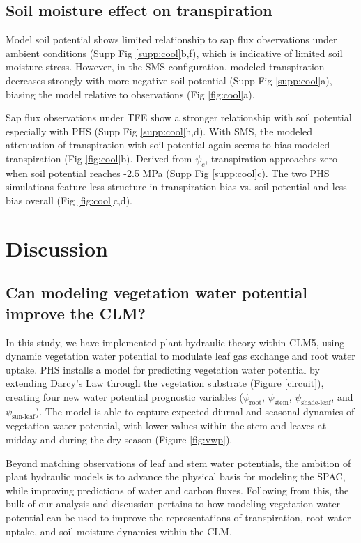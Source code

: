 \documentclass[draft,linenumbers]{agujournal}
\begin{document}
 
\subsection{Soil moisture effect on transpiration}    
    Model soil potential shows limited relationship to sap flux observations under ambient conditions (Supp Fig \ref{supp:cool}b,f), which is indicative of limited soil moisture stress.
    However, in the SMS configuration, modeled transpiration decreases strongly with more negative soil potential (Supp Fig \ref{supp:cool}a),
    biasing the model relative to observations (Fig \ref{fig:cool}a).
    
    Sap flux observations under TFE show a stronger relationship with soil potential especially with PHS (Supp Fig \ref{supp:cool}h,d).
    With SMS, the modeled attenuation of transpiration with soil potential again seems to bias modeled transpiration (Fig \ref{fig:cool}b).
    Derived from $\psi_c$, transpiration approaches zero when soil potential reaches -2.5 MPa (Supp Fig \ref{supp:cool}c).
    The two PHS simulations feature less structure in transpiration bias vs. soil potential and less bias overall (Fig \ref{fig:cool}c,d).
    
\section{Discussion}
\subsection{Can modeling vegetation water potential improve the CLM?}

    In this study, we have implemented plant hydraulic theory within CLM5, 
    using dynamic vegetation water potential to modulate leaf gas exchange and root water uptake.
    PHS installs a model for predicting vegetation water potential by extending Darcy's Law through the vegetation substrate (Figure \ref{circuit}), 
    creating four new water potential prognostic variables ($\psi_{\text{root}}$, $\psi_{\text{stem}}$, $\psi_{\text{shade-leaf}}$, and $\psi_{\text{sun-leaf}}$).  
    The model is able to capture expected diurnal and seasonal dynamics of vegetation water potential, 
    with lower values within the stem and leaves at midday and during the dry season (Figure \ref{fig:vwp}).
    
    Beyond matching observations of leaf and stem water potentials, the ambition of plant hydraulic models is to advance the physical basis for modeling the SPAC, while improving predictions of water and carbon fluxes. 
    Following from this, the bulk of our analysis and discussion pertains to how modeling vegetation water potential can be used to improve the representations of transpiration, root water uptake, and soil moisture dynamics within the CLM. 
\end{document}
